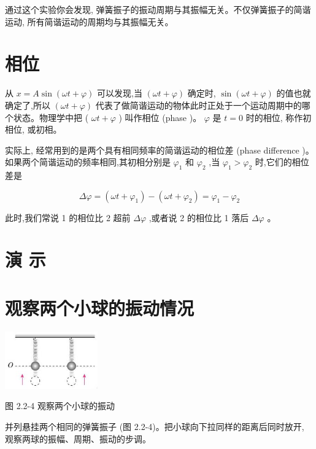 \documentclass[10pt]{article}
\begin{document}
通过这个实验你会发现, 弹簧振子的振动周期与其振幅无关。不仅弹簧振子的简谐运动, 所有简谐运动的周期均与其振幅无关。

\section*{相位}

从 \(x = A\sin \left( {{\omega t} + \varphi }\right)\) 可以发现,当 \(\left( {{\omega t} + \varphi }\right)\) 确定时, \(\sin \left( {{\omega t} + \varphi }\right)\) 的值也就确定了,所以 \(\left( {{\omega t} + \varphi }\right)\) 代表了做简谐运动的物体此时正处于一个运动周期中的哪个状态。物理学中把 ( \({\omega t} + \varphi\) ) 叫作相位 (phase )。 \(\varphi\) 是 \(t = 0\) 时的相位, 称作初相位, 或初相。

实际上, 经常用到的是两个具有相同频率的简谐运动的相位差 (phase difference )。如果两个简谐运动的频率相同,其初相分别是 \({\varphi }_{1}\) 和 \({\varphi }_{2}\) ,当 \({\varphi }_{1} > {\varphi }_{2}\) 时,它们的相位差是

\[
{\Delta \varphi } = \left( {{\omega t} + {\varphi }_{1}}\right) - \left( {{\omega t} + {\varphi }_{2}}\right) = {\varphi }_{1} - {\varphi }_{2}
\]

此时,我们常说 1 的相位比 2 超前 \({\Delta \varphi }\) ,或者说 2 的相位比 1 落后 \({\Delta \varphi }\) 。

\section*{演 示}

\section*{观察两个小球的振动情况}

\begin{center}
\includegraphics[max width=0.3\textwidth]{images/01910e4c-ebb8-7d2c-8f2f-2375bc1d2d12_43_625651.jpg}
\end{center}

图 2.2-4 观察两个小球的振动

并列悬挂两个相同的弹簧振子 (图 2.2-4)。把小球向下拉同样的距离后同时放开, 观察两球的振幅、周期、振动的步调。
\end{document}
